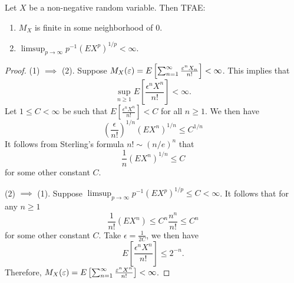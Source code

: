 \documentclass[a4paper]{article}
\begin{document}
\begin{prop}
  Let $X$ be a non-negative random variable. Then TFAE:
  \begin{enumerate}
    \item $M_X$ is finite in some neighborhood of $0$.
    \item $\limsup_{p \to \infty} p^{-1} (E X^p)^{1 / p} < \infty$.
  \end{enumerate}
\end{prop}

\begin{proof}
  (1) $\implies$ (2). Suppose $M_X (\varepsilon) = E \left[ \sum_{n=1}^\infty \frac{\varepsilon^n
        X_n}{n!} \right] < \infty$. This implies that
  \[
    \sup_{n \geq 1} E \left[ \frac{\epsilon^n X^n}{n!} \right] < \infty.
  \]
  Let $1 \leq C < \infty$ be such that $E \left[ \frac{\epsilon^n X^n}{n!} \right] < C$
  for all $n \geq 1$. We then have
  \[
    \left( \frac{\epsilon}{n!} \right)^{1 / n} \left( E X^n  \right)^{1 / n}
    \leq C^{1 / n}
  \]
  It follows from Sterling's formula $n! \sim \left( n / e \right)^n$
  that
  \[
    \frac{1}{n} \left( E X^n \right)^{1 / n} \leq C
  \]
  for some other constant $C$.

  (2) $\implies$ (1). Suppose $\limsup_{p \to \infty} p^{-1} \left( E X^p \right)
    ^{1 / p} \leq C < \infty$. It follows that for any $n \geq 1$
  \[
    \frac{1}{n!} \left( E X^n \right) \leq C^n \frac{n^n}{n!} \leq C^n
  \]
  for some other constant $C$.
  Take $\epsilon = \frac{1}{2 C}$, we then have
  \[
    E \left[ \frac{\epsilon^n X^n}{n!} \right] \leq 2^{-n}.
  \]
  Therefore, $M_X (\varepsilon)
    = E \left[ \sum_{n=1}^\infty \frac{\varepsilon^n X^n}{n!} \right] < \infty$.

\end{proof}
\end{document}
